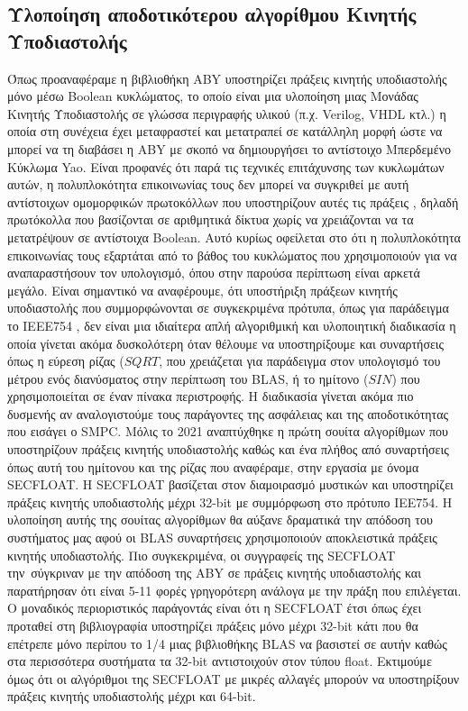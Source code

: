 \subsection{Υλοποίηση αποδοτικότερου αλγορίθμου Κινητής Υποδιαστολής}
Όπως προαναφέραμε η βιβλιοθήκη ABY υποστηρίζει πράξεις κινητής υποδιαστολής μόνο μέσω Boolean κυκλώματος, το οποίο είναι μια υλοποίηση μιας Μονάδας Κινητής Υποδιαστολής σε γλώσσα περιγραφής υλικού (π.χ. Verilog, VHDL κτλ.) η οποία στη συνέχεια έχει μεταφραστεί και μετατραπεί σε κατάλληλη μορφή ώστε να μπορεί να τη διαβάσει η ABY με σκοπό να δημιουργήσει το αντίστοιχο Μπερδεμένο Κύκλωμα Yao. Είναι προφανές ότι παρά τις τεχνικές επιτάχυνσης των κυκλωμάτων αυτών, η πολυπλοκότητα επικοινωνίας τους δεν μπορεί να συγκριθεί με αυτή αντίστοιχων ομομορφικών πρωτοκόλλων που υποστηρίζουν αυτές τις πράξεις \cite{cryptoeprint:2022/322} \cite{alxd1}, δηλαδή πρωτόκολλα που βασίζονται σε αριθμητικά δίκτυα χωρίς να χρειάζονται να τα μετατρέψουν σε αντίστοιχα Boolean. Αυτό κυρίως οφείλεται στο ότι η πολυπλοκότητα επικοινωνίας τους εξαρτάται από το βάθος του κυκλώματος που χρησιμοποιούν για να αναπαραστήσουν τον υπολογισμό, όπου στην παρούσα περίπτωση είναι αρκετά μεγάλο. Είναι σημαντικό να αναφέρουμε, ότι υποστήριξη πράξεων κινητής υποδιαστολής που συμμορφώνονται σε συγκεκριμένα πρότυπα, όπως για παράδειγμα το IEEE754 \cite{8766229}, δεν είναι μια ιδιαίτερα απλή αλγοριθμική και υλοποιητική διαδικασία \cite{10.5555/1096483} η οποία γίνεται ακόμα δυσκολότερη όταν θέλουμε να υποστηρίξουμε και συναρτήσεις όπως η εύρεση ρίζας ($SQRT$, που χρειάζεται για παράδειγμα στον υπολογισμό του μέτρου ενός διανύσματος στην περίπτωση του BLAS, ή το ημίτονο ($SIN$) που χρησιμοποιείται σε έναν πίνακα περιστροφής. Η διαδικασία γίνεται ακόμα πιο δυσμενής αν αναλογιστούμε τους παράγοντες της ασφάλειας και της αποδοτικότητας που εισάγει ο SMPC. Μόλις το 2021 αναπτύχθηκε η πρώτη σουίτα αλγορίθμων που υποστηρίζουν πράξεις κινητής υποδιαστολής καθώς και ένα πλήθος από συναρτήσεις όπως αυτή του ημίτονου και της ρίζας που αναφέραμε, στην εργασία \cite{cryptoeprint:2022/322} με όνομα SECFLOAT. Η SECFLOAT βασίζεται στον διαμοιρασμό μυστικών και υποστηρίζει πράξεις κινητής υποδιαστολής μέχρι 32-bit με συμμόρφωση στο πρότυπο IEE754. Η υλοποίηση αυτής της σουίτας αλγορίθμων θα αύξανε δραματικά την απόδοση του συστήματος μας αφού οι BLAS συναρτήσεις χρησιμοποιούν αποκλειστικά πράξεις κινητής υποδιαστολής. Πιο συγκεκριμένα, οι συγγραφείς της SECFLOAT την\ σύγκριναν με την απόδοση της ABY σε πράξεις κινητής υποδιαστολής και παρατήρησαν ότι είναι 5-11 φορές γρηγορότερη ανάλογα με την πράξη που επιλέγεται. Ο μοναδικός περιοριστικός παράγοντάς είναι ότι η SECFLOAT έτσι όπως έχει προταθεί στη βιβλιογραφία υποστηρίζει πράξεις μόνο μέχρι 32-bit κάτι που θα επέτρεπε μόνο περίπου το 1/4 μιας βιβλιοθήκης BLAS να βασιστεί σε αυτήν καθώς στα περισσότερα συστήματα τα 32-bit αντιστοιχούν στον τύπου float. Εκτιμούμε όμως ότι οι αλγόριθμοι της SECFLOAT με μικρές αλλαγές μπορούν να υποστηρίξουν πράξεις κινητής υποδιαστολής μέχρι και 64-bit.

